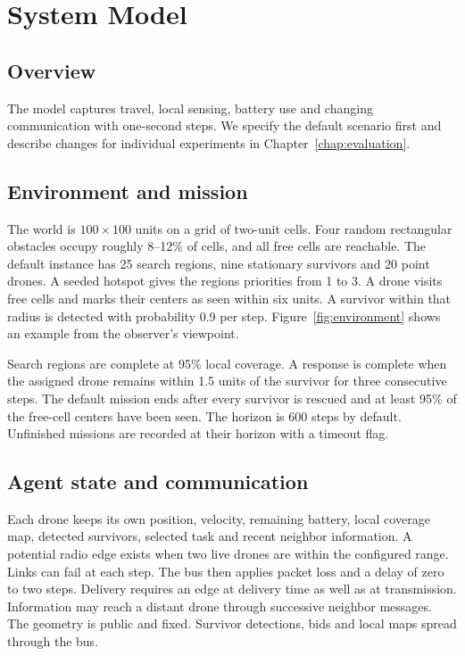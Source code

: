 \chapter{System Model}
\section{Overview}
The model captures travel, local sensing, battery use and changing communication with one-second steps. We specify the default scenario first and describe changes for individual experiments in Chapter~\ref{chap:evaluation}.

\section{Environment and mission}
The world is $100 \times 100$ units on a grid of two-unit cells. Four random rectangular obstacles occupy roughly 8--12\% of cells, and all free cells are reachable. The default instance has 25 search regions, nine stationary survivors and 20 point drones. A seeded hotspot gives the regions priorities from 1 to 3. A drone visits free cells and marks their centers as seen within six units. A survivor within that radius is detected with probability 0.9 per step. Figure~\ref{fig:environment} shows an example from the observer's viewpoint.


Search regions are complete at 95\% local coverage. A response is complete when the assigned drone remains within 1.5 units of the survivor for three consecutive steps. The default mission ends after every survivor is rescued and at least 95\% of the free-cell centers have been seen. The horizon is 600 steps by default. Unfinished missions are recorded at their horizon with a timeout flag.

\section{Agent state and communication}
Each drone keeps its own position, velocity, remaining battery, local coverage map, detected survivors, selected task and recent neighbor information. A potential radio edge exists when two live drones are within the configured range. Links can fail at each step. The bus then applies packet loss and a delay of zero to two steps. Delivery requires an edge at delivery time as well as at transmission. Information may reach a distant drone through successive neighbor messages. The geometry is public and fixed. Survivor detections, bids and local maps spread through the bus.

